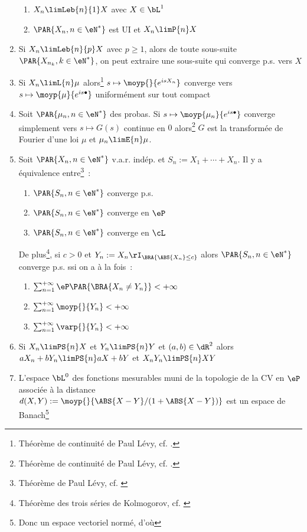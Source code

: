 \begin{enumerate}
\begin{enumerate}
  \item $X_n\limLeb{n}{1}X$ avec $X\in\bL^1$
  \item $\PAR{X_n,n\in\eN^*}$ est UI et $X_n\limP{n}X$
  \end{enumerate}
\item Si $X_n\limLeb{n}{p}X$ avec $p\geq 1$, alors de toute sous-suite
  $\PAR{X_{n_k},k\in\eN^*}$, on peut extraire une sous-suite qui converge p.s.
  vers $X$
\item Si $X_n\limL{n}\mu$ alors\footnote{Théorème de continuité de Paul Lévy,
    cf. \cite[p. 32]{borkar}.}  $s\mapsto\moyp{}{e^{isX_n}}$ converge vers
  $s\mapsto\moyp{\mu}{e^{is\bullet}}$ uniformément sur tout compact
\item Soit $\PAR{\mu_n,n\in\eN^*}$ des probas. Si
  $s\mapsto\moyp{\mu_n}{e^{is\bullet}}$ converge simplement vers $s\mapsto G(s)$
  continue en $0$ alors\footnote{Théorème de continuité de Paul Lévy, cf.
    \cite[p.  32]{borkar}.} $G$ est la transformée de Fourier d'une loi $\mu$ et
  $\mu_n\limE{n}\mu$.
\item Soit $\PAR{X_n,n\in\eN^*}$ v.a.r. indép. et $S_n:=X_1+\cdots+X_n$. Il y a
  équivalence entre\footnote{Théorème de Paul Lévy, cf. \cite[p.
    83]{borkar}}~:
  \begin{enumerate}
  \item $\PAR{S_n,n\in\eN^*}$ converge p.s.
  \item $\PAR{S_n,n\in\eN^*}$ converge en $\eP$
  \item $\PAR{S_n,n\in\eN^*}$ converge en $\cL$
  \end{enumerate}
  De plus\footnote{Théorème des trois séries de Kolmogorov, cf. \cite[p.
    85]{borkar}}, si $c>0$ et $Y_n:=X_n\rI_{\BRA{\ABS{X_n}\leq c}}$ alors
  $\PAR{S_n,n\in\eN^*}$ converge p.s. ssi on a à la fois~:
 \begin{enumerate}
 \item $\sum_{n=1}^{+\infty} \eP\PAR{\BRA{X_n\neq Y_n}}<+\infty$
 \item $\sum_{n=1}^{+\infty} \moyp{}{Y_n}<+\infty$
 \item $\sum_{n=1}^{+\infty} \varp{}{Y_n}<+\infty$ 
 \end{enumerate}
\item Si $X_n\limPS{n}X$ et $Y_n\limPS{n}Y$ et $(a,b)\in\dR^2$ alors 
  $aX_n+bY_n\limPS{n}aX+bY$ et $X_nY_n\limPS{n}XY$
\item L'espace $\bL^0$ des fonctions mesurables muni de la topologie de la CV
  en $\eP$ associée à la distance $d(X,Y):=\moyp{}{\ABS{X-Y}/(1+\ABS{X-Y})}$
  est un espace de Banach\footnote{Donc un espace vectoriel normé, d'où
}
\end{enumerate}
